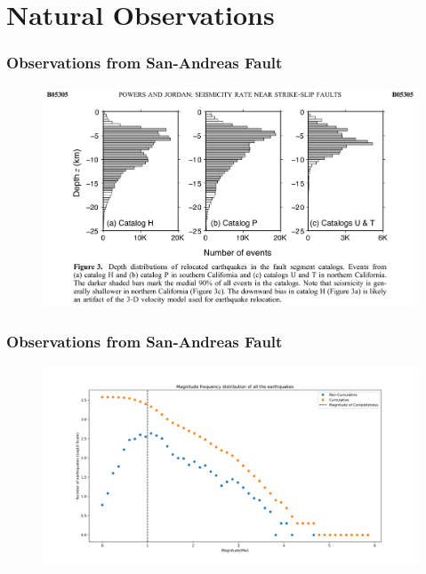 \documentclass{beamer}
\begin{document}
\section{Natural Observations}
\begin{frame}
    \frametitle{Observations from San-Andreas Fault}
    \begin{figure}
        \includegraphics[width=\textwidth]{images/seismicitydepth.png} 
    \end{figure}
\end{frame}
\begin{frame}
    \frametitle{Observations from San-Andreas Fault}
    \begin{figure}
        \includegraphics[width=\textwidth]{images/mfd_complete} 
    \end{figure}
\end{frame}

\end{document}
